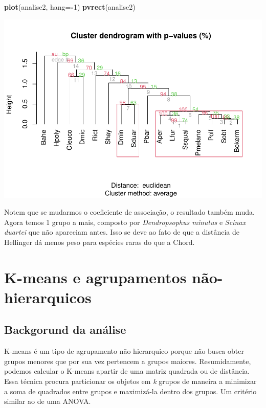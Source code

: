 \documentclass[
]{book}
\newenvironment{Shaded}{\begin{snugshade}}{\end{snugshade}}
\newcommand{\DataTypeTok}[1]{\textcolor[rgb]{0.13,0.29,0.53}{#1}}
\newcommand{\DecValTok}[1]{\textcolor[rgb]{0.00,0.00,0.81}{#1}}
\newcommand{\KeywordTok}[1]{\textcolor[rgb]{0.13,0.29,0.53}{\textbf{#1}}}
\newcommand{\NormalTok}[1]{#1}
\newcommand{\OperatorTok}[1]{\textcolor[rgb]{0.81,0.36,0.00}{\textbf{#1}}}
\begin{document}
\begin{Shaded}
\begin{Highlighting}[]
\KeywordTok{plot}\NormalTok{(analise2, }\DataTypeTok{hang=}\OperatorTok{-}\DecValTok{1}\NormalTok{)}
\KeywordTok{pvrect}\NormalTok{(analise2)}
\end{Highlighting}
\end{Shaded}

\includegraphics{livro_r_ecologia_files/figure-latex/unnamed-chunk-7-1.pdf}

Notem que se mudarmos o coeficiente de associação, o resultado também muda. Agora temos 1 grupo a mais, composto por \emph{Dendropsophus minutus} e \emph{Scinax duartei} que não apareciam antes. Isso se deve ao fato de que a distância de Hellinger dá menos peso para espécies raras do que a Chord.

\hypertarget{k-means-e-agrupamentos-nuxe3o-hierarquicos}{%
\chapter{K-means e agrupamentos não-hierarquicos}\label{k-means-e-agrupamentos-nuxe3o-hierarquicos}}

\hypertarget{backgorund-da-anuxe1lise-1}{%
\section{Backgorund da análise}\label{backgorund-da-anuxe1lise-1}}

K-means é um tipo de agrupamento não hierarquico porque não busca obter grupos menores que por sua vez pertencem a grupos maiores. Resumidamente, podemos calcular o K-means apartir de uma matriz quadrada ou de distância. Essa técnica procura particionar os objetos em \emph{k} grupos de maneira a minimizar a soma de quadrados entre grupos e maximizá-la dentro dos grupos. Um critério similar ao de uma ANOVA.
\end{document}
